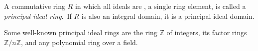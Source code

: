 \documentclass[12pt]{article}
\begin{document}
A commutative ring $R$ in which all ideals are ,   a single ring element, is called a {\em principal ideal ring}.\, If $R$ is also an integral domain, it is a principal ideal domain.

Some well-known principal ideal rings are the ring $\mathbb{Z}$ of integers, its factor rings $\mathbb{Z}/n\mathbb{Z}$, and any polynomial ring over a field.
\end{document}
